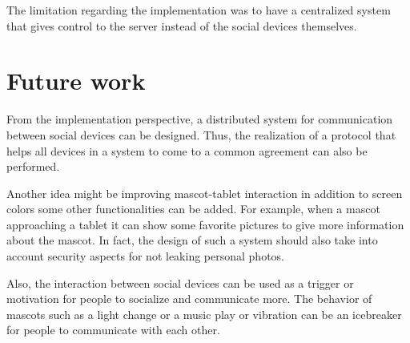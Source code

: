 The limitation regarding the implementation was to have a centralized system that gives
control to the server instead of the social devices themselves.

\section{Future work}
\label{sec:future-work}
From the implementation perspective, a distributed system for communication between
social devices can be designed.
Thus, the realization of a protocol that helps all devices in a system to come to a
common agreement can also be performed.

Another idea might be improving mascot-tablet interaction in addition to screen colors
some other functionalities can be added.
For example, when a mascot approaching a tablet it can show some favorite pictures
to give more information about the mascot.
In fact, the design of such a system should also take into account security aspects for not leaking personal photos.

Also, the interaction between social devices can be used as a trigger or
motivation for people to socialize and communicate more.
The behavior of mascots such as a light change or a music play or vibration can be an icebreaker for people to communicate with each other.